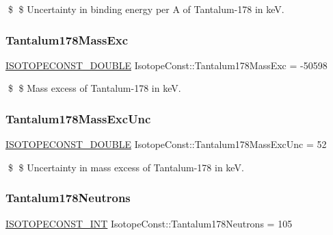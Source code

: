 \$ \$ Uncertainty in binding energy per A of Tantalum-\/178 in keV. \mbox{\label{group___isotope_const-_tantalum-_ta178_gaaeffa711e3ee2188f94c8297fce5268d}} 
\subsubsection{\texorpdfstring{Tantalum178\+Mass\+Exc}{Tantalum178MassExc}}
{\footnotesize\ttfamily \mbox{\hyperlink{group___isotope_const-_macros_ga8f45a7272ce02c0b4c65c44636ed719a}{I\+S\+O\+T\+O\+P\+E\+C\+O\+N\+S\+T\+\_\+\+D\+O\+U\+B\+LE}} Isotope\+Const\+::\+Tantalum178\+Mass\+Exc = -\/50598}

\$ \$ Mass excess of Tantalum-\/178 in keV. \mbox{\label{group___isotope_const-_tantalum-_ta178_ga1e7ac1c9254fa674962d4ad3fd439515}} 
\subsubsection{\texorpdfstring{Tantalum178\+Mass\+Exc\+Unc}{Tantalum178MassExcUnc}}
{\footnotesize\ttfamily \mbox{\hyperlink{group___isotope_const-_macros_ga8f45a7272ce02c0b4c65c44636ed719a}{I\+S\+O\+T\+O\+P\+E\+C\+O\+N\+S\+T\+\_\+\+D\+O\+U\+B\+LE}} Isotope\+Const\+::\+Tantalum178\+Mass\+Exc\+Unc = 52}

\$ \$ Uncertainty in mass excess of Tantalum-\/178 in keV. \mbox{\label{group___isotope_const-_tantalum-_ta178_ga43d188c80bc6eac532372fdaffdb566f}} 
\subsubsection{\texorpdfstring{Tantalum178\+Neutrons}{Tantalum178Neutrons}}
{\footnotesize\ttfamily \mbox{\hyperlink{group___isotope_const-_macros_ga5f18360b3e99483a35c32d789e62621c}{I\+S\+O\+T\+O\+P\+E\+C\+O\+N\+S\+T\+\_\+\+I\+NT}} Isotope\+Const\+::\+Tantalum178\+Neutrons = 105}

